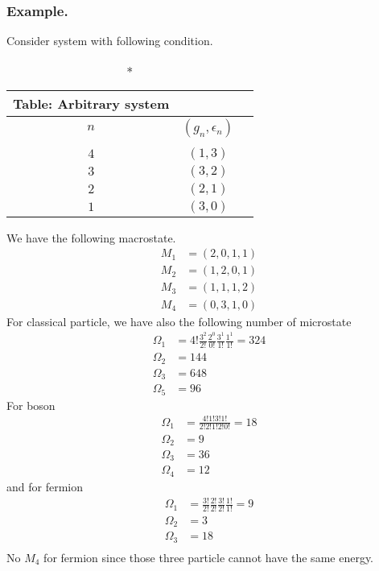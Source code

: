 \documentclass[../../../Main.tex]{subfiles}
\begin{document}
\subsubsection*{Example.} Consider system with following condition.
\begin{longtable}{c c c}
    \caption*{Table: Arbitrary system}\\
    \hline
    $n$ & $(g_n,\epsilon_n)$\\ 
    \hline\\

    $4$&$(1,3)$\\
    $3$&$(3,2)$\\
    $2$&$(2,1)$\\
    $1$&$(3,0)$\\
\end{longtable}
We have the following macrostate.
\begin{align*}
    M_1&=(2,0,1,1)\\
    M_2&=(1,2,0,1)\\
    M_3&=(1,1,1,2)\\
    M_4&=(0,3,1,0)
\end{align*}
For classical particle, we have also the following number of microstate
\begin{align*}
    \Omega_1&=4!\frac{3^2}{2!}\frac{2^0}{0!}\frac{3^1}{1!}\frac{1^1}{1!}=324\\
    \Omega_2&=144\\
    \Omega_3&=648\\
    \Omega_5&=96
\end{align*}
For boson 
\begin{align*}
    \Omega_1&=\frac{4!1!3!1!}{2!2!1!2!0!}=18\\
    \Omega_2&=9\\
    \Omega_3&=36\\
    \Omega_4&=12
\end{align*}
and for fermion
\begin{align*}
    \Omega_1&=\frac{3!}{2!}\frac{2!}{2!}\frac{3!}{2!}\frac{1!}{1!}=9\\
    \Omega_2&=3\\
    \Omega_3&=18\\
\end{align*}
No $M_4$ for fermion since those three particle cannot have the same energy.
\end{document}
